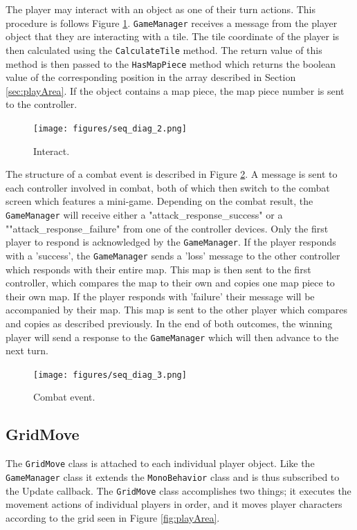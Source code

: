 The player may interact with an object as one of their turn actions. This procedure is follows Figure \ref{fig:seqDiag2}. \texttt{GameManager} receives a message from the player object that they are interacting with a tile. The tile coordinate of the player is then calculated using the \texttt{CalculateTile} method. The return value of this method is then passed to the \texttt{HasMapPiece} method which returns the boolean value of the corresponding position in the array described in Section \ref{sec:playArea}. If the object contains a map piece, the map piece number is sent to the controller.

\begin{figure}
	\centering
	\texttt{[image: figures/seq\_diag\_2.png]}
	\caption{Interact. \label{fig:seqDiag2}}
\end{figure}

The structure of a combat event is described in Figure \ref{fig:seqDiag3}. A message is sent to each controller involved in combat, both of which then switch to the combat screen which features a mini-game. Depending on the combat result, the \texttt{GameManager} will receive either a "attack\_response\_success" or a ""attack\_response\_failure" from one of the controller devices. Only the first player to respond is acknowledged by the \texttt{GameManager}. If the player responds with a 'success', the \texttt{GameManager} sends a 'loss' message to the other controller which responds with their entire map. This map is then sent to the first controller, which compares the map to their own and copies one map piece to their own map. If the player responds with 'failure' their message will be accompanied by their map. This map is sent to the other player which compares and copies as described previously. In the end of both outcomes, the winning player will send a response to the \texttt{GameManager} which will then advance to the next turn.

\begin{figure}
	\centering
	\texttt{[image: figures/seq\_diag\_3.png]}
	\caption{Combat event. \label{fig:seqDiag3}}
\end{figure}

\subsection{GridMove}
The \texttt{GridMove} class is attached to each individual player object. Like the \texttt{GameManager} class it extends the \texttt{MonoBehavior} class and is thus subscribed to the Update callback. The \texttt{GridMove} class accomplishes two things; it executes the movement actions of individual players in order, and it moves player characters according to the grid seen in Figure \ref{fig:playArea}. 

